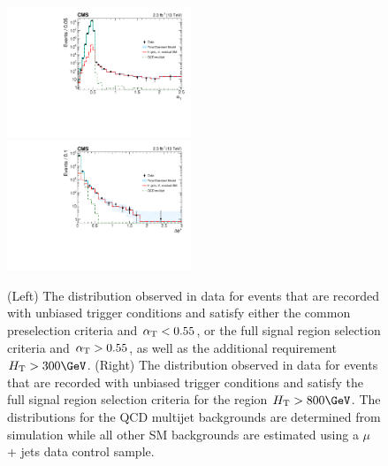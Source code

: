\begin{figure}[!h]
  \begin{center}
    \includegraphics[width=0.49\textwidth]{figures/kine/v1/AlphaT_Paper} \,
    \includegraphics[width=0.49\textwidth]{figures/kine/v1/BDPhi_paper} \\
  \end{center}
  \caption{
    (Left) The \alphat distribution observed in data for events
    that are recorded with unbiased trigger conditions and satisfy
    either the common preselection criteria and $\alpha_{\text{T}} < 0.55$,
    or the full signal region selection criteria and $\alpha_{\text{T}} > 0.55$,
    as well as the additional requirement $\scalht > 300\GeV$. 
    (Right) The \bdphi distribution observed in data for events
    that are recorded with unbiased trigger conditions and satisfy the
    full signal region selection criteria for the region $\scalht >
    800\GeV$. 
    The distributions for the QCD multijet backgrounds are determined
    from simulation while all other SM backgrounds are estimated using
    a $\mu$ + jets data control sample.
    \label{fig:alphat-bdphi} 
  }
\end{figure}

